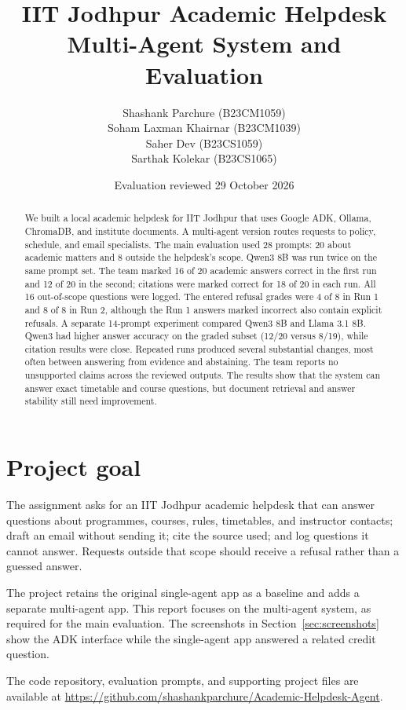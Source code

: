 \documentclass[11pt,a4paper]{article}
\title{IIT Jodhpur Academic Helpdesk\\[0.35em]
\large Multi-Agent System and Evaluation}
\author{Shashank Parchure (B23CM1059)\\
Soham Laxman Khairnar (B23CM1039)\\
Saher Dev (B23CS1059)\\
Sarthak Kolekar (B23CS1065)}
\date{Evaluation reviewed 29 October 2026}
\begin{document}
\maketitle

\begin{abstract}
We built a local academic helpdesk for IIT Jodhpur that uses Google ADK, Ollama, ChromaDB, and institute documents. A multi-agent version routes requests to policy, schedule, and email specialists. The main evaluation used 28 prompts: 20 about academic matters and 8 outside the helpdesk's scope. Qwen3 8B was run twice on the same prompt set. The team marked 16 of 20 academic answers correct in the first run and 12 of 20 in the second; citations were marked correct for 18 of 20 in each run. All 16 out-of-scope questions were logged. The entered refusal grades were 4 of 8 in Run 1 and 8 of 8 in Run 2, although the Run 1 answers marked incorrect also contain explicit refusals. A separate 14-prompt experiment compared Qwen3 8B and Llama 3.1 8B. Qwen3 had higher answer accuracy on the graded subset (12/20 versus 8/19), while citation results were close. Repeated runs produced several substantial changes, most often between answering from evidence and abstaining. The team reports no unsupported claims across the reviewed outputs. The results show that the system can answer exact timetable and course questions, but document retrieval and answer stability still need improvement.
\end{abstract}

\tableofcontents
\newpage

\section{Project goal}

The assignment asks for an IIT Jodhpur academic helpdesk that can answer questions about programmes, courses, rules, timetables, and instructor contacts; draft an email without sending it; cite the source used; and log questions it cannot answer. Requests outside that scope should receive a refusal rather than a guessed answer.

The project retains the original single-agent app as a baseline and adds a separate multi-agent app. This report focuses on the multi-agent system, as required for the main evaluation. The screenshots in Section~\ref{sec:screenshots} show the ADK interface while the single-agent app answered a related credit question.

The code repository, evaluation prompts, and supporting project files are available at \url{https://github.com/shashankparchure/Academic-Helpdesk-Agent}.
\end{document}
